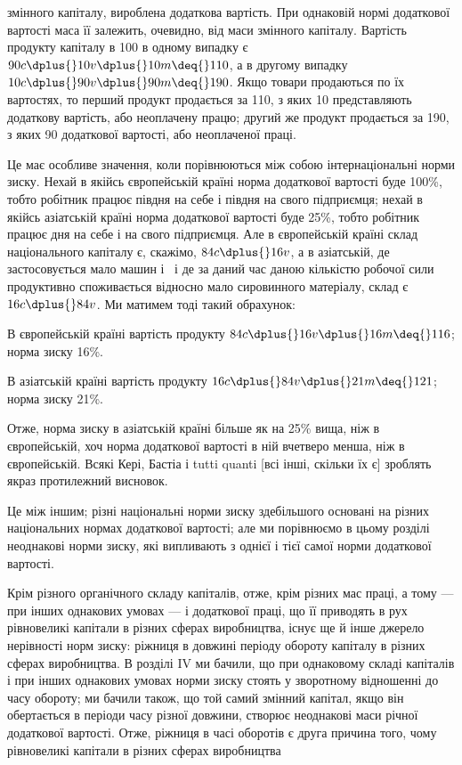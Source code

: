 \parcont{}  %
змінного капіталу, вироблена додаткова вартість. При однаковій
нормі додаткової вартості маса її залежить, очевидно, від маси
змінного капіталу. Вартість продукту капіталу в 100 в одному
випадку є $90 c \dplus{} 10 v \dplus{} 10 m \deq{} 110$, а в другому випадку $10 c \dplus{} 90 v \dplus{} 90 m \deq{} 190$. Якщо товари
продаються по їх вартостях,
то перший продукт продається за 110, з яких 10 представляють додаткову вартість, або неоплачену
працю; другий же
продукт продається за 190, з яких 90 додаткової вартості, або
неоплаченої праці.

Це має особливе значення, коли порівнюються між собою
інтернаціональні норми зиску. Нехай в якійсь європейській країні
норма додаткової вартості буде 100\%, тобто робітник працює
півдня на себе і півдня на свого підприємця; нехай в якійсь
азіатській країні норма додаткової вартості буде 25\%, тобто робітник працює  дня на себе і  на
свого підприємця. Але
в європейській країні склад національного капіталу є, скажімо,
$84 c \dplus{} 16 v$, а в азіатській, де застосовується мало машин і~
і де за даний час даною кількістю робочої сили продуктивно
споживається відносно мало сировинного матеріалу, склад є
$16 c \dplus{} 84 v$. Ми матимем тоді такий обрахунок:

В європейській країні вартість продукту \deq{} $84 c \dplus{} 16 v \dplus{} 16 m \deq{} 116$; норма зиску \deq{}  \deq{} 16\%.

В азіатській країні вартість продукту \deq{} $16 c \dplus{} 84 v \dplus{} 21 m \deq{} 121$; норма зиску \deq{}  \deq{} 21\%.

Отже, норма зиску в азіатській країні більше як на 25\% вища, ніж в європейській, хоч норма
додаткової вартості в ній
вчетверо менша, ніж в європейській. Всякі Кері, Бастіа і tutti quanti [всі інші, скільки їх є]
зроблять якраз протилежний висновок.

Це між іншим; різні національні норми зиску здебільшого
основані на різних національних нормах додаткової вартості;
але ми порівнюємо в цьому розділі неоднакові норми зиску,
які випливають з однієї і тієї самої норми додаткової вартості.

Крім різного органічного складу капіталів, отже, крім різних
мас праці, а тому — при інших однакових умовах — і додаткової
праці, що її приводять в рух рівновеликі капітали в різних сферах
виробництва, існує ще й інше джерело нерівності норм зиску:
ріжниця в довжині періоду обороту капіталу в різних сферах
виробництва. В розділі IV ми бачили, що при однаковому складі
капіталів і при інших однакових умовах норми зиску стоять у зворотному відношенні до часу обороту;
ми бачили також, що
той самий змінний капітал, якщо він обертається в періоди
часу різної довжини, створює неоднакові маси річної додаткової вартості. Отже, ріжниця в часі
оборотів є друга причина
того, чому рівновеликі капітали в різних сферах виробництва
\parbreak{}  %
